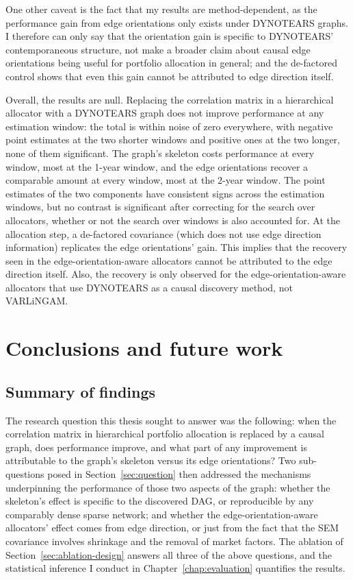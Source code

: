 \documentclass[11pt, a4paper]{report}
\begin{document}
One other caveat is the fact that my results are method-dependent, as the performance gain from edge orientations only exists under DYNOTEARS graphs. I therefore can only say that the orientation gain is specific to DYNOTEARS' contemporaneous structure, not make a broader claim about causal edge orientations being useful for portfolio allocation in general; and the de-factored control shows that even this gain cannot be attributed to edge direction itself.

Overall, the results are null. Replacing the correlation matrix in a hierarchical allocator with a DYNOTEARS graph does not improve performance at any estimation window: the total is within noise of zero everywhere, with negative point estimates at the two shorter windows and positive ones at the two longer, none of them significant. The graph's skeleton costs performance at every window, most at the 1-year window, and the edge orientations recover a comparable amount at every window, most at the 2-year window.
The point estimates of the two components have consistent signs across the estimation windows, but no contrast is significant after correcting for the search over allocators, whether or not the search over windows is also accounted for.
At the allocation step, a de-factored covariance (which does not use edge direction information) replicates the edge orientations' gain. This implies that the recovery seen in the edge-orientation-aware allocators cannot be attributed to the edge direction itself. Also, the recovery is only observed for the edge-orientation-aware allocators that use DYNOTEARS as a causal discovery method, not VARLiNGAM.

\chapter{Conclusions and future work}
\label{chap:conclusion}

\section{Summary of findings}
\label{sec:summary}

The research question this thesis sought to answer was the following:
when the correlation matrix in
hierarchical portfolio allocation is replaced by a causal graph, does
performance improve, and what part of any improvement is attributable to
the graph's skeleton versus its edge orientations?
Two sub-questions posed in Section~\ref{sec:question} then addressed the mechanisms underpinning the performance of those two aspects of the graph:
whether the skeleton's effect is specific to the discovered DAG, or
reproducible by any comparably dense sparse network; and whether the
edge-orientation-aware allocators' effect comes from edge direction, or just from the fact that the SEM covariance involves shrinkage and the removal of market factors.
The ablation of Section~\ref{sec:ablation-design} answers all three of the above questions, and the statistical inference 
I conduct in Chapter~\ref{chap:evaluation} quantifies the results.
\end{document}
